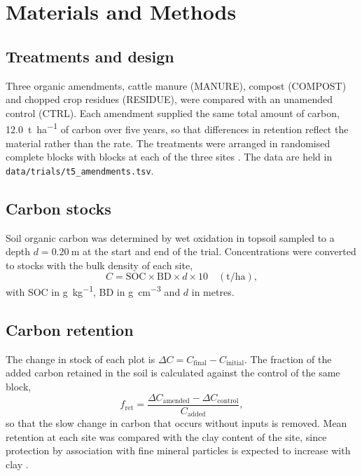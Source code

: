\section{Materials and Methods}

\subsection{Treatments and design}
Three organic amendments, cattle manure (MANURE), compost (COMPOST) and
chopped crop residues (RESIDUE), were compared with an unamended control
(CTRL). Each amendment supplied the same total amount of carbon,
\SI{12.0}{\tonne\per\hectare} of carbon over five years, so that differences in
retention reflect the material rather than the rate. The treatments were
arranged in randomised complete blocks with  blocks at each of the three
sites \parencite{gomez1984}. The data are held in
\texttt{data/trials/t5\_amendments.tsv}.

\subsection{Carbon stocks}
Soil organic carbon was determined by wet oxidation in topsoil sampled to a
depth $d = \SI{0.20}{\metre}$ at the start and end of the trial. Concentrations
were converted to stocks with the bulk density of each site,
\begin{equation}
  C = \mathrm{SOC}\times \mathrm{BD}\times d \times 10
  \quad (\si{\tonne\per\hectare}),
  \label{eq:stock}
\end{equation}
with SOC in \si{\gram\per\kilo\gram}, BD in \si{\gram\per\centi\metre\cubed}
and $d$ in metres.

\subsection{Carbon retention}
The change in stock of each plot is
$\Delta C = C_{\mathrm{final}} - C_{\mathrm{initial}}$. The fraction of the
added carbon retained in the soil is calculated against the control of the same
block,
\begin{equation}
  f_{\mathrm{ret}} = \frac{\Delta C_{\mathrm{amended}} - \Delta C_{\mathrm{control}}}{C_{\mathrm{added}}},
  \label{eq:retention}
\end{equation}
so that the slow change in carbon that occurs without inputs is removed. Mean
retention at each site was compared with the clay content of the site, since
protection by association with fine mineral particles is expected to increase
with clay \parencite{six2002,vonlutzow2006}.
